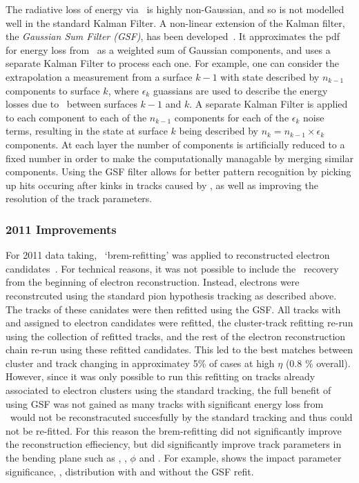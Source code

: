 The radiative loss of energy via \brem\ is highly non-Gaussian, and so is not
modelled well in the standard Kalman Filter. A non-linear extension of the
Kalman filter, the {\it Gaussian Sum Filter (GSF)}, has been
developed~\cite{Fruhwirth2003131,Atkinson:1448253}. It
approximates the pdf for energy loss from \brem\ as a weighted sum of Gaussian
components, and uses a separate Kalman Filter to process each one. For example,
one can consider the extrapolation a measurement from a surface $k-1$ with state
described by $n_{k-1}$ components to surface $k$, where $\epsilon_{k}$ guassians
are used to describe the energy losses due to \brem\ between surfaces $k-1$ and
$k$. A separate Kalman Filter is applied to each component to each of the $n_{k-1}$
components for each of the $\epsilon_{k}$ noise terms, resulting in the state at
surface $k$ being described by $n_{k} = n_{k-1} \times \epsilon_{k}$ components.
At each layer the number of components is artificially reduced to a fixed number
in order to make the computationally managable by merging similar components.
Using the GSF filter allows for better pattern recognition by picking up hits
occuring after kinks in tracks caused by \brem, as well as improving the
resolution of the track parameters.

\subsubsection{2011 Improvements}

For 2011 data taking, \brem\ `brem-refitting' was applied to
reconstructed electron candidates~\cite{ATLAS-CONF-2012-047}. For technical reasons, it was not possible to
include the \brem\ recovery from the beginning of electron reconstruction.
Instead, electrons were reconstrcuted using the standard pion hypothesis
tracking as described above. The tracks of these canidates were then refitted
using the GSF. All tracks with  and  assigned to
electron candidates were refitted, the cluster-track refitting re-run
using the collection of refitted tracks, and the rest of the electron reconstruction
chain re-run using these refitted candidates. This led to the best matches between
cluster and track changing in approximatey 5\% of cases at high $\eta$ (0.8 \%
overall). However, since it was only possible to run this refitting on tracks
already associated to electron clusters using the standard tracking, the full
benefit of using GSF was not gained as many tracks with significant energy loss
from \brem\ would not be reconstracuted succesfully by the standard tracking and
thus could not be re-fitted. For this reason the brem-refitting did not
significantly improve the reconstruction effieciency, but did significantly
improve track parameters in the bending plane such as \dzero, \dzerosig,
$\phi$ and \qoverp. For example,  shows the impact parameter
significance, \dzerosig, distribution with and without the GSF refit. 

